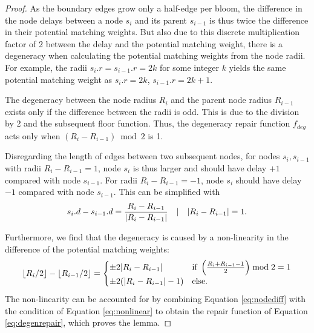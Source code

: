 \begin{proof}
  As the boundary edges grow only a half-edge per bloom, the difference in the node delays between a node $s_i$ and its parent $s_{i-1}$ is thus twice the difference in their potential matching weights. But also due to this discrete multiplication factor of 2 between the delay and the potential matching weight, there is a degeneracy when calculating the potential matching weights from the node radii. For example, the radii $s_i.r = s_{i-1}.r = 2k$ for some integer $k$ yields the same potential matching weight as $s_i.r = 2k$, $s_{i-1}.r = 2k + 1$.

  The degeneracy between the node radius $R_i$ and the parent node radius $R_{i-1}$ exists only if the difference between the radii is odd. This is due to the division by 2 and the subsequent floor function. Thus, the degeneracy repair function $f_{deg}$ acts only when $(R_i - R_{i-1}) \bmod 2$ is 1. 
  
  Disregarding the length of edges between two subsequent nodes, for nodes $s_i, s_{i-1}$ with radii $R_i-R_{i-1}=1$, node $s_i$ is thus larger and should have delay $+1$ compared with node $s_{i-1}$. For radii $R_i-R_{i-1}=-1$, node $s_i$ should have delay $-1$ compared with node $s_{i-1}$. This can be simplified with
  \begin{equation}\label{eq:nodediff}
    s_i.d - s_{i-1}.d = \frac{R_i - R_{i-1}}{\abs{R_i - R_{i-1}}} \hspace{1em} | \hspace{1em} \abs{R_i - R_{i-1}} = 1.
  \end{equation}
  
  Furthermore, we find that the degeneracy is caused by a non-linearity in the difference of the potential matching weights:
  \begin{equation}\label{eq:nonlinear}
    {\left \lfloor R_i/2 \right \rfloor }-{\left \lfloor R_{i-1}/2 \right \rfloor } = 
    \begin{cases}
      \pm 2\abs{R_i - R_{i-1}} & \text{if } \left(\frac{R_i+R_{i-1}-1}{2}\right)\bmod 2 = 1 \\
      \pm 2(\abs{R_i - R_{i-1}} - 1) & \text{else}.
    \end{cases}
  \end{equation}
   The non-linearity can be accounted for by combining Equation \eqref{eq:nodediff} with the condition of Equation \eqref{eq:nonlinear} to obtain the repair function of Equation \eqref{eq:degenrepair}, which proves the lemma. 
\end{proof}

